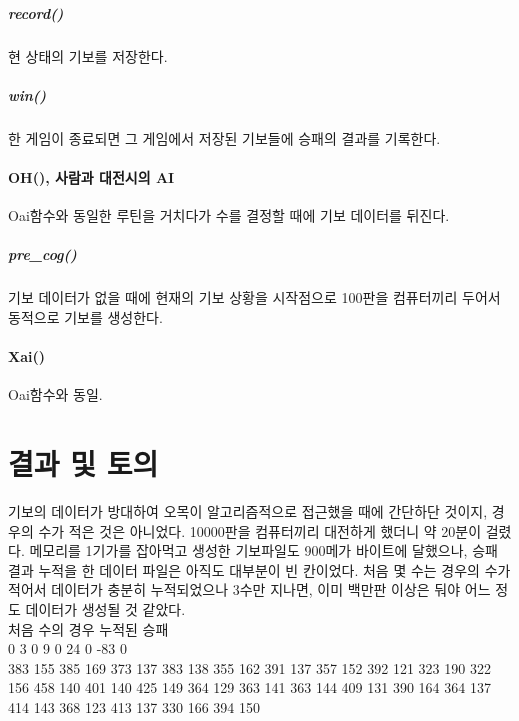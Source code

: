\documentclass[12pt,a4paper]{report}
\begin{document}
\paragraph{record()} 현 상태의 기보를 저장한다.
\paragraph{win()} 한 게임이 종료되면 그 게임에서 저장된 기보들에 승패의 결과를 기록한다.

\subsubsection{OH(), 사람과 대전시의 AI}
Oai함수와 동일한 루틴을 거치다가 수를 결정할 때에 기보 데이터를 뒤진다.
\paragraph{pre\_cog()}
기보 데이터가 없을 때에 현재의 기보 상황을 시작점으로 100판을 컴퓨터끼리 두어서 동적으로 기보를 생성한다.

\subsubsection{Xai()}
Oai함수와 동일.

\chapter{결과 및 토의}
기보의 데이터가 방대하여 오목이 알고리즘적으로 접근했을 때에 간단하단 것이지, 경우의 수가 적은 것은 아니었다.
10000판을 컴퓨터끼리 대전하게 했더니 약 20분이 걸렸다.
메모리를 1기가를 잡아먹고 생성한 기보파일도 900메가 바이트에 달했으나, 승패 결과 누적을 한 데이터 파일은 아직도 대부분이 빈 칸이었다.
처음 몇 수는 경우의 수가 적어서 데이터가 충분히 누적되었으나 3수만 지나면, 이미 백만판 이상은 둬야 어느 정도 데이터가 생성될 것 같았다.
\\

처음 수의 경우 누적된 승패\\
 0 3 0 9 0 24 0 -83 0 \\
 383 155 385 169 373 137 383 138 355 162 391 137 357 152 392 121 323 190 322 156 458 140 401 140 425 149 364 129 363 141 363 144 409 131 390 164 364 137 414 143 368 123 413 137 330 166 394 150 
\\
\end{document}
